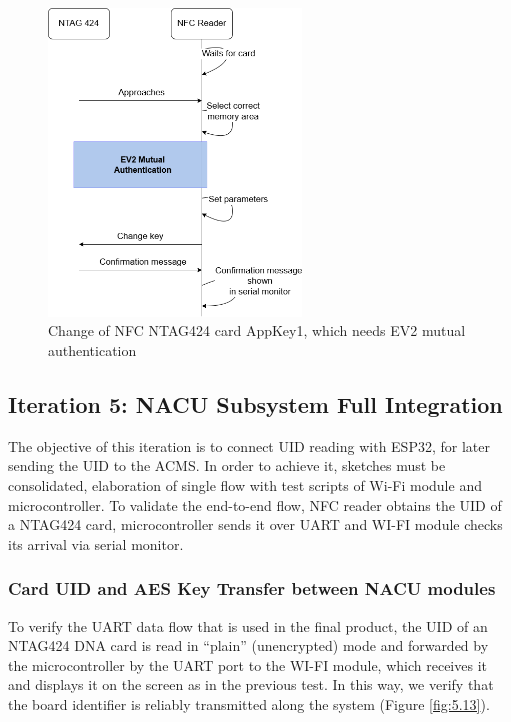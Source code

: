 \begin{figure}[H]
	\centering
	\includegraphics[width=0.6\textwidth]{imaxes/KEYCANGE} %
	\caption{Change of NFC NTAG424 card AppKey1, which needs EV2 mutual authentication}
	\label{fig:5.12}
\end{figure}

\subsection{Iteration 5: NACU Subsystem Full Integration}

The objective of this iteration is to connect UID reading with ESP32, for later sending the UID to the ACMS. In order to achieve it, sketches must be consolidated, elaboration of single flow with test scripts of Wi-Fi module and microcontroller. To validate the end-to-end flow, NFC reader obtains the UID of a NTAG424 card, microcontroller sends it over UART and WI-FI module checks its arrival via serial monitor.

\subsubsection{Card UID and AES Key Transfer between NACU modules}

To verify the UART data flow that is used in the final product, the UID of an NTAG424 DNA card is read in “plain” (unencrypted) mode and forwarded by the microcontroller by the UART port to the WI-FI module, which receives it and displays it on the screen as in the previous test. In this way, we verify that the board identifier is reliably transmitted along the system (Figure \ref{fig:5.13}).

